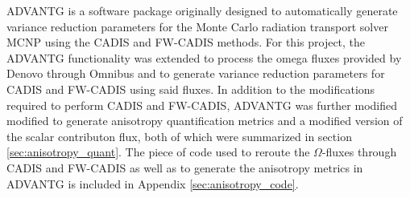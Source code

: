 ADVANTG \cite{mosher_new_2010} is a software package
originally designed to automatically
generate variance reduction
parameters for the Monte Carlo radiation transport solver
MCNP \cite{brown_mcnp_2002}
using the CADIS
and FW-CADIS methods. For this project, the ADVANTG functionality was extended to
process the omega fluxes provided by Denovo through Omnibus and to generate
variance reduction
parameters for CADIS and FW-CADIS using said fluxes. In addition to the
modifications required to perform CADIS and FW-CADIS, ADVANTG was further modified
modified to generate anisotropy quantification metrics and a modified version of
the scalar contributon flux, both of which were summarized in
section \ref{sec:anisotropy_quant}. The piece of code used to
reroute the $\Omega$-fluxes
through CADIS and FW-CADIS as well as to generate the anisotropy metrics in
ADVANTG is included in Appendix \ref{sec:anisotropy_code}.
